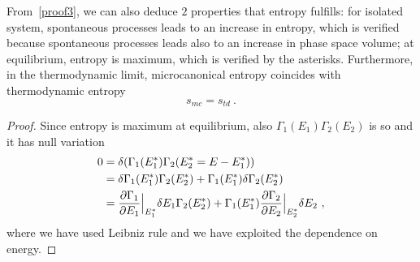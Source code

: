     From~\eqref{proof3}, we can also deduce $2$ properties that entropy fulfills: for isolated system, spontaneous processes leads to an increase in entropy, which is verified because spontaneous processes leads also to an increase in phase space volume; at equilibrium, entropy is maximum, which is verified by the asterisks. Furthermore, in the thermodynamic limit, microcanonical entropy coincides with thermodynamic entropy
    \begin{equation*}
        s_{mc} = s_{td} ~.
    \end{equation*}
    \begin{proof}
        Since entropy is maximum at equilibrium, also $\Gamma_1(E_1) \Gamma_2(E_2)$ is so and it has null variation
        \begin{equation*}
        \begin{aligned}
            0 & = \delta (\Gamma_1(E^*_1) \Gamma_2(E^*_2 = E - E^*_1)) \\ & = \delta \Gamma_1(E^*_1) \Gamma_2 (E^*_2) + \Gamma_1(E^*_1) \delta \Gamma_2 (E^*_2) \\ & = \frac{\partial\Gamma_1}{\partial E_1} \Big\vert_{E^*_1} \delta E_1 \Gamma_2 (E^*_2) + \Gamma_1(E^*_1) \frac{\partial\Gamma_2}{\partial E_2} \Big\vert_{E^*_2} \delta E_2 ~,
        \end{aligned}
        \end{equation*}
        where we have used Leibniz rule and we have exploited the dependence on energy.


\end{proof}
